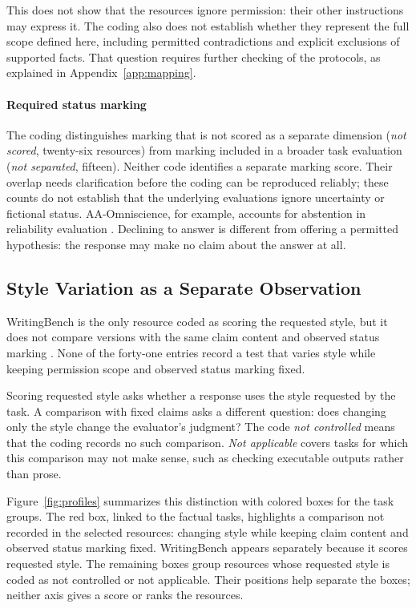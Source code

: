 \documentclass{clv2025}
\begin{document}
This does not show that the resources ignore permission: their other
instructions may express it. The coding also does not establish whether they
represent the full scope defined here, including permitted contradictions
and explicit exclusions of supported facts. That question requires further
checking of the protocols, as explained in Appendix~\ref{app:mapping}.

\paragraph{Required status marking}
The coding distinguishes marking that is not scored as a separate dimension
(\emph{not scored}, twenty-six resources) from marking included in a broader
task evaluation (\emph{not separated}, fifteen). Neither code identifies a
separate marking score. Their overlap needs clarification before the coding
can be reproduced reliably; these counts do not establish that the underlying
evaluations ignore uncertainty or fictional status.
AA-Omniscience, for example, accounts for abstention in reliability evaluation
\citep{jackson_aaomniscience_2025}. Declining to answer is different from
offering a permitted hypothesis: the response may make no claim about the
answer at all.

\subsection{Style Variation as a Separate Observation}

WritingBench is the only resource coded as scoring the requested style, but
it does not compare versions with the same claim content and observed status marking
\citep{wu_writingbench_2025}. None of the forty-one entries record a test
that varies style while keeping permission scope and observed status marking fixed.

Scoring requested style asks whether a response uses the style requested
by the task. A comparison with fixed claims asks a different question:
does changing only the style change the evaluator's judgment? The code
\emph{not controlled} means that the coding records no such comparison.
\emph{Not applicable} covers tasks for which this comparison may not make
sense, such as checking executable outputs rather than prose.

Figure~\ref{fig:profiles} summarizes this distinction with colored boxes for
the task groups. The red box, linked to the factual tasks, highlights a
comparison not recorded in the selected resources: changing style while
keeping claim content and observed status marking fixed. WritingBench
appears separately because it scores requested style. The remaining boxes
group resources whose requested style is coded as not controlled or not
applicable. Their positions help separate the boxes; neither axis gives a
score or ranks the resources.
\end{document}
